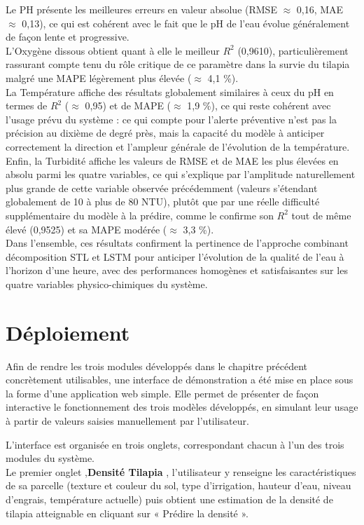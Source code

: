 \documentclass[a4paper,12pt, oneside]{article}
\begin{document}
Le PH présente les meilleures erreurs en valeur absolue (RMSE $\approx$ 0,16, MAE $\approx$ 0,13), ce qui est cohérent avec le fait que le pH de l'eau évolue généralement de façon lente et progressive.\\
L'Oxygène dissous obtient quant à elle le meilleur $R^2$ (0,9610), particulièrement rassurant compte tenu du rôle critique de ce paramètre dans la survie du tilapia malgré une MAPE légèrement plus élevée ($\approx$ 4,1 \%). \\
La Température affiche des résultats globalement similaires à ceux du pH en termes de $R^2$ ($\approx$ 0,95) et de MAPE ($\approx$ 1,9 \%), ce qui reste cohérent avec l'usage prévu du système : ce qui compte pour l'alerte préventive n'est pas la précision au dixième de degré près, mais la capacité du modèle à anticiper correctement la direction et l'ampleur générale de l'évolution de la température. \\
Enfin, la Turbidité affiche les valeurs de RMSE et de MAE les plus élevées en absolu parmi les quatre variables, ce qui s'explique par l'amplitude naturellement plus grande de cette variable observée précédemment (valeurs s'étendant globalement de 10 à plus de 80 NTU), plutôt que par une réelle difficulté supplémentaire du modèle à la prédire, comme le confirme son $R^2$ tout de même élevé (0,9525) et sa MAPE modérée ($\approx$ 3,3 \%).\\

Dans l'ensemble, ces résultats confirment la pertinence de l'approche combinant décomposition STL et LSTM pour anticiper l'évolution de la qualité de l'eau à l'horizon d'une heure, avec des performances homogènes et satisfaisantes sur les quatre variables physico-chimiques du système.



\section{Déploiement}

Afin de rendre les trois modules développés dans le chapitre précédent concrètement utilisables, une interface de démonstration a été mise en place sous la forme d'une application web simple. Elle permet de présenter de façon interactive le fonctionnement des trois modèles développés, en simulant leur usage à partir de valeurs saisies manuellement par l'utilisateur.

L'interface est organisée en trois onglets, correspondant chacun à l'un des trois modules du système.\\
Le premier onglet ,\textbf{Densité Tilapia} , l'utilisateur y renseigne les caractéristiques de sa parcelle (texture et couleur du sol, type d'irrigation, hauteur d'eau, niveau d'engrais, température actuelle) puis obtient une estimation de la densité de tilapia atteignable en cliquant sur « Prédire la densité ».
\end{document}
